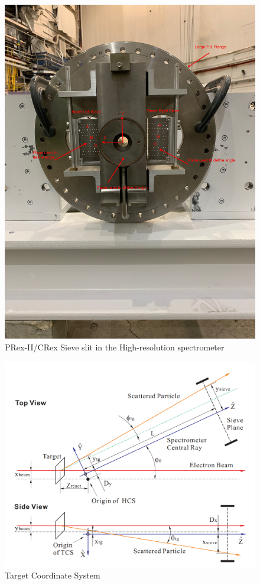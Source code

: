\begin{figure}
    \centering
    \includegraphics[width =\textwidth]{images/chap4/sieve_in_hrs.jpg}
    \caption{PRex-II/CRex Sieve slit in the High-resolution spectrometer}
    \label{fig:labeled_sieve_in_hrs}
\end{figure}


\begin{figure}
    \centering
    \includegraphics[width =\textwidth]{images/chap4/target_coordinate_system.png}
    \caption{Target Coordinate System}
    \label{fig:target_coordinate_system_plot}
\end{figure}


